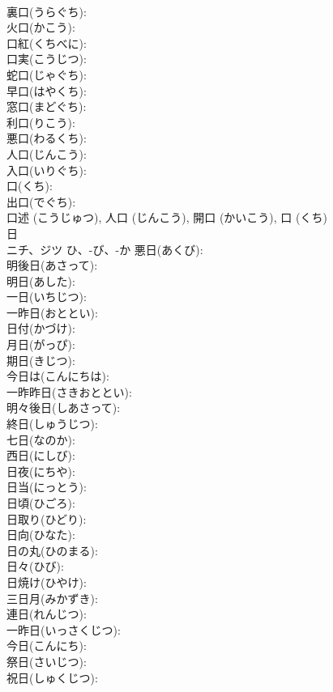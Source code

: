 \documentclass[8pt]{extreport}
\begin{document}
\begin{CJK}{UTF8}{min}
\\	裏口(うらぐち): 
\\	火口(かこう): 
\\	口紅(くちべに): 
\\	口実(こうじつ): 
\\	蛇口(じゃぐち): 
\\	早口(はやくち): 
\\	窓口(まどぐち): 
\\	利口(りこう): 
\\	悪口(わるくち): 
\\	人口(じんこう): 
\\	入口(いりぐち): 
\\	口(くち): 
\\	出口(でぐち): 
\\	口述 (こうじゅつ), 人口 (じんこう), 開口 (かいこう), 口 (くち)
\\	日			
\\	ニチ、ジツ	ひ、-び、-か	悪日(あくび): 
\\	明後日(あさって): 
\\	明日(あした): 
\\	一日(いちじつ): 
\\	一昨日(おととい): 
\\	日付(かづけ): 
\\	月日(がっぴ): 
\\	期日(きじつ): 
\\	今日は(こんにちは): 
\\	一昨昨日(さきおととい): 
\\	明々後日(しあさって): 
\\	終日(しゅうじつ): 
\\	七日(なのか): 
\\	西日(にしび): 
\\	日夜(にちや): 
\\	日当(にっとう): 
\\	日頃(ひごろ): 
\\	日取り(ひどり): 
\\	日向(ひなた): 
\\	日の丸(ひのまる): 
\\	日々(ひび): 
\\	日焼け(ひやけ): 
\\	三日月(みかずき): 
\\	連日(れんじつ): 
\\	一昨日(いっさくじつ): 
\\	今日(こんにち): 
\\	祭日(さいじつ): 
\\	祝日(しゅくじつ): 

\end{CJK}
\end{document}
